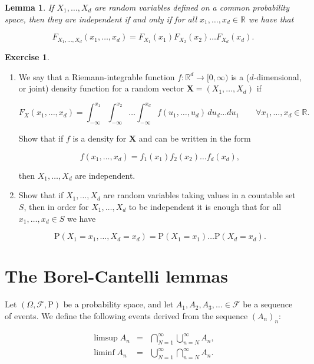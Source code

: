\documentclass[11pt]{report}
\providecommand{\cal}{\mathcal}
\newcommand{\R}{\mathbb{R}}
\theoremstyle{plain}
\newtheorem{lem}[thm]{Lemma}
\theoremstyle{definition}
\newtheorem{xexercise}[thm]{Exercise}
\begin{document}
\begin{lem}
If $X_1,\ldots,X_d$ are random variables defined on a
common probability space, then they are independent if
and only if for all $x_1,\ldots,x_d \in \R$ we have
that

\[
F_{X_1,\ldots,X_d}(x_1,\ldots,x_d) = F_{X_1}(x_1) F_{X_2}(x_2) \ldots F_{X_d}(x_d).
\]

\end{lem}

\begin{xexercise}

\begin{enumerate}[label=(\roman*)]
\item We say that a Riemann-integrable function
$f:\R^d\to[0,\infty)$ is a ($d$-dimensional, or
joint) density function for a random vector
$\mathbf{X}=(X_1,\ldots,X_d)$ if

\[
F_X(x_1,\ldots,x_d) = \int_{-\infty}^{x_1} \int_{-\infty}^{x_2} \ldots \int_{-\infty}^{x_d}
f(u_1,\ldots,u_d)\,du_d\ldots du_1 \qquad \forall x_1,\ldots,x_d \in \R.
\]

Show that if $f$ is a density for $\mathbf{X}$ and
can be written in the form

\[
f(x_1,\ldots,x_d) = f_1(x_1) f_2(x_2) \ldots f_d(x_d),
\]

then $X_1,\ldots,X_d$ are independent.

\item Show that if $X_1,\ldots,X_d$ are random variables
taking values in a countable set $S$, then in order
for $X_1,\ldots,X_d$ to be independent it is enough
that for all $x_1,\ldots,x_d\in S$ we have

\[
\mathrm{P}(X_1=x_1,\ldots,X_d = x_d) = \mathrm{P}(X_1=x_1)\ldots \mathrm{P}(X_d=x_d).
\]
\end{enumerate}

\end{xexercise}

\chapter{The Borel-Cantelli lemmas}
Let $(\Omega, {\cal F}, \mathrm{P})$ be a probability
space, and let $A_1, A_2, A_3, \ldots \in {\cal F}$
be a sequence of events. We define the following
events derived from the sequence $(A_n)_n$:

\begin{eqnarray*}
\limsup A_n &=& \bigcap_{N=1}^\infty \bigcup_{n=N}^\infty A_n, \\
\liminf A_n &=& \bigcup_{N=1}^\infty \bigcap_{n=N}^\infty A_n.
\end{eqnarray*}
\end{document}
